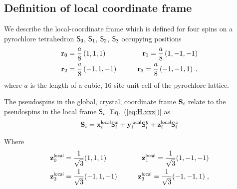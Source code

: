 \documentclass[apsrev4-1,prx,superscriptaddress,floatfix,twocolumn,longbibliography]{revtex4-1}
\begin{document}
\begin{appendix}

\section{Definition of local coordinate frame}
\label{app:coordinates}

We describe the local-coordinate frame which is defined for
four spins on a pyrochlore tetrahedron
${\sf S_0}$,
${\sf S_1}$,
${\sf S_2}$,
${\sf S_3}$ occupying positions 
%
\begin{eqnarray}
&{\bf r}_0 =  \frac{a}{8} \left( 1, 1, 1 \right) 
\qquad 
&{\bf r}_1 =  \frac{a}{8} \left( 1,-1,-1 \right) 
\nonumber \\
&{\bf r}_2 =  \frac{a}{8} \left( -1,1,-1 \right) 
\qquad 
&{\bf r}_3 = \frac{a}{8} \left( -1,-1,1 \right) 
\; ,
\label{eq:r}
\end{eqnarray}
%
where $a$ is the length of a cubic, 16-site unit 
cell of the pyrochlore lattice.    


The pseudospins in the global, crystal, coordinate frame ${\bf S}_i$
relate to the pseudospins  in the local frame ${\sf S}_i$ [Eq.~(\ref{eq:H.xxz})]
as 
\begin{eqnarray}
{\bf S}_i=
\mathbf{x}^{\sf local}_i {\sf S}^x_i
+
\mathbf{y}^{\sf local}_i {\sf S}^y_i
+
\mathbf{z}^{\sf local}_i {\sf S}^z_i
\end{eqnarray}


Where
%
\begin{eqnarray}
&\mathbf{z}^{\sf local}_0 = \dfrac{1}{\sqrt{3}}(1,1,1)
\qquad
&\mathbf{z}^{\sf local}_1 = \dfrac{1}{\sqrt{3}}(1,-1,-1) 
\nonumber \\
&\mathbf{z}^{\sf local}_2 = \dfrac{1}{\sqrt{3}}(-1,1,-1)
\qquad
&\mathbf{z}^{\sf local}_3 = \dfrac{1}{\sqrt{3}}(-1,-1,1) 
\; , \nonumber
\label{eq:local-111-axis}\\
\end{eqnarray}



\end{appendix}
\end{document}
